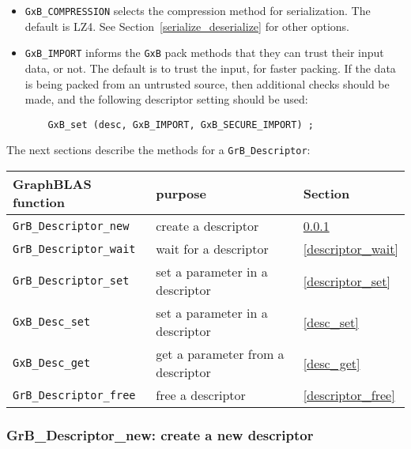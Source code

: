 \documentclass[12pt]{article}
\begin{document}
{\begin{itemize}
\item \verb'GxB_COMPRESSION' selects the compression method for serialization.
    The default is LZ4.  See Section~\ref{serialize_deserialize} for other
    options.

\item \verb'GxB_IMPORT' informs the \verb'GxB' pack methods
    that they can trust their input data, or not.  The default is to trust
    the input, for faster packing.  If the data is being packed from an
    untrusted source, then additional checks should be made, and the 
    following descriptor setting should be used:

    {\footnotesize
    \begin{verbatim}
    GxB_set (desc, GxB_IMPORT, GxB_SECURE_IMPORT) ; \end{verbatim}}

\end{itemize}

The next sections describe the methods for a \verb'GrB_Descriptor':

\vspace{0.2in}
{\footnotesize
\begin{tabular}{lll}
\hline
GraphBLAS function   & purpose                                      & Section \\
\hline
\verb'GrB_Descriptor_new'        & create a descriptor                  & \ref{descriptor_new} \\
\verb'GrB_Descriptor_wait'       & wait for a descriptor                & \ref{descriptor_wait} \\
\verb'GrB_Descriptor_set'        & set a parameter in a descriptor      & \ref{descriptor_set} \\
\verb'GxB_Desc_set'              & set a parameter in a descriptor      & \ref{desc_set}  \\
\verb'GxB_Desc_get'              & get a parameter from a descriptor    & \ref{desc_get}  \\
\verb'GrB_Descriptor_free'       & free a descriptor                    & \ref{descriptor_free} \\
\hline
\end{tabular}
}

\newpage
\subsubsection{{\sf GrB\_Descriptor\_new:}  create a new descriptor}
\label{descriptor_new}

}
\end{document}
